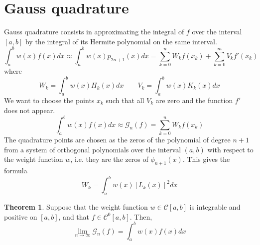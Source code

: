 \documentclass[12pt, openany]{report}
\theoremstyle{definition}
\newtheorem{thm}{Theorem}[chapter]
\begin{document}
\section{Gauss quadrature}
Gauss quadrature consists in approximating the integral of $f$ over the interval $[a,b]$ by the integral of its Hermite polynomial on the same interval. 
\begin{equation}
    \int_a^b w(x)f(x)dx \approx \int_a^b w(x)p_{2n+1}(x)dx  = \sum_{k=0}^n W_kf(x_k)+\sum_{k=0}^m V_k f'(x_k)
\end{equation}
where 
\begin{equation}
    W_k = \int_a^bw(x)H_k(x)dx \qquad V_k = \int_a^bw(x)K_k(x)dx
\end{equation}
We want to choose the points $x_k$ such that all $V_k$ are zero and the function $f'$ does not appear. \\
\begin{equation}
    \int_a^b w(x)f(x)dx \approx\mathcal{G}_n(f)= \sum_{k=0}^n W_kf(x_k)
\end{equation}
The quadrature points are chosen as the zeros of the polynomial of degree $n+1$ from a system of orthogonal polynomials over the interval $(a,b)$ with respect to the weight function $w$, i.e. they are the zeros of $\phi_{n+1}(x)$.
This gives the formula 
\begin{equation}
    W_k = \int_a^b w(x)[L_k(x)]^2dx 
\end{equation}
\begin{thm}
    Suppose that the weight function $w\in \mathcal{C}[a,b]$ is integrable and positive on $[a,b]$, and that $f\in \mathcal{C}^0[a,b]$. Then,
    \begin{equation}
        \lim_{n\rightarrow \infty}\mathcal{G}_n(f) = \int_a^b w(x)f(x)dx
    \end{equation}
\end{thm}
\end{document}
